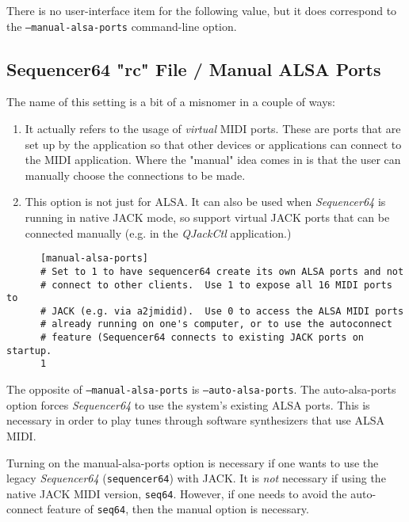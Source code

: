    There is no user-interface item for the following value, but
   it does correspond to the \texttt{--manual-alsa-ports} command-line
   option.

\subsection{Sequencer64 "rc" File / Manual ALSA Ports}
\label{subsec:seq64_rc_file_manual_ports}

   The name of this setting is a bit of a misnomer in a couple of ways:

   \begin{enumerate}
      \item It actually refers to the usage of \textsl{virtual} MIDI ports.
         These are ports that are set up by the application so that other
         devices or applications can connect to the MIDI application.
         Where the "manual" idea comes in is that the user can manually choose
         the connections to be made.
      \item This option is not just for ALSA.  It can also be used when
         \textsl{Sequencer64} is running in native JACK mode, so support
         virtual JACK ports that can be connected manually (e.g. in the
         \textsl{QJackCtl} application.)
   \end{enumerate}

   \begin{verbatim}
      [manual-alsa-ports]
      # Set to 1 to have sequencer64 create its own ALSA ports and not
      # connect to other clients.  Use 1 to expose all 16 MIDI ports to
      # JACK (e.g. via a2jmidid).  Use 0 to access the ALSA MIDI ports
      # already running on one's computer, or to use the autoconnect
      # feature (Sequencer64 connects to existing JACK ports on startup.
      1
   \end{verbatim}

   The opposite of \texttt{--manual-alsa-ports}
   is \texttt{--auto-alsa-ports}.  The auto-alsa-ports option
   forces \textsl{Sequencer64} to use the system's existing ALSA ports.
   This is necessary in order to play tunes through software synthesizers that
   use ALSA MIDI.

   Turning on the manual-alsa-ports option is necessary if one
   wants to use the legacy \textsl{Sequencer64} (\texttt{sequencer64})
   with JACK.
   It is \textsl{not} necessary if using the native JACK MIDI version,
   \texttt{seq64}.
   However, if one needs to avoid the auto-connect feature of \texttt{seq64},
   then the manual option is necessary.

